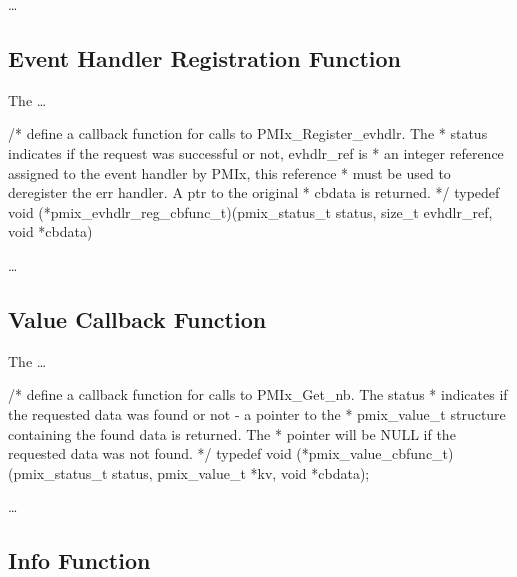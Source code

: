 \descr

\ldots



\subsection{Event Handler Registration Function}

The  \ldots

\cspecificstart
\begin{codepar}
/* define a callback function for calls to PMIx_Register_evhdlr. The
 * status indicates if the request was successful or not, evhdlr_ref is
 * an integer reference assigned to the event handler by PMIx, this reference
 * must be used to deregister the err handler. A ptr to the original
 * cbdata is returned. */
typedef void (*pmix_evhdlr_reg_cbfunc_t)(pmix_status_t status,
                                         size_t evhdlr_ref,
                                         void *cbdata)
\end{codepar}
\cspecificend

\descr

\ldots



\subsection{Value Callback Function}

The  \ldots

\cspecificstart
\begin{codepar}
/* define a callback function for calls to PMIx_Get_nb. The status
 * indicates if the requested data was found or not - a pointer to the
 * pmix_value_t structure containing the found data is returned. The
 * pointer will be NULL if the requested data was not found. */
typedef void (*pmix_value_cbfunc_t)(pmix_status_t status,
                                    pmix_value_t *kv, void *cbdata);
\end{codepar}
\cspecificend

\descr

\ldots


\subsection{Info Function}

